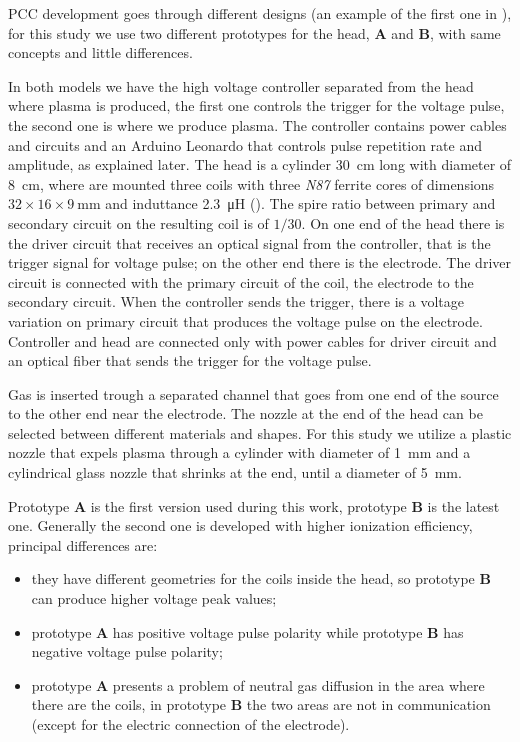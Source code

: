 PCC development goes through different designs (an example of the first one in \cite{unipd:ceciliaDBD}), for this study we use two different prototypes for the head, \textbf{A} and \textbf{B}, with same concepts and little differences.

In both models we have the high voltage controller separated from the head where plasma is produced, the first one controls the trigger for the voltage pulse, the second one is where we produce plasma.
The controller contains power cables and circuits and an Arduino Leonardo that controls pulse repetition rate and amplitude, as explained later.
The head is a cylinder \SI{30}{\centi\meter} long with diameter of \SI{8}{\centi\meter}, where are mounted three coils with three \emph{N87} ferrite cores of dimensions $32 \times 16 \times \SI{9}{\milli\meter}$ and induttance \SI{2.3}{\micro\henry} (\cite{N87datasheet}). The spire ratio between primary and secondary circuit on the resulting coil is of $1/30$.
On one end of the head there is the driver circuit that receives an optical signal from the controller, that is the trigger signal for voltage pulse; on the other end there is the electrode. The driver circuit is connected with the primary circuit of the coil, the electrode to the secondary circuit. When the controller sends the trigger, there is a voltage variation on primary circuit that produces the voltage pulse on the electrode.
Controller and head are connected only with power cables for driver circuit and an optical fiber that sends the trigger for the voltage pulse.

Gas is inserted trough a separated channel that goes from one end of the source to the other end near the electrode.
The nozzle at the end of the head can be selected between different materials and shapes. For this study we utilize a plastic nozzle that expels plasma through a cylinder with diameter of \SI{1}{\milli\meter} and a cylindrical glass nozzle that shrinks at the end, until a diameter of \SI{5}{\milli\meter}. 

Prototype \textbf{A} is the first version used during this work, prototype \textbf{B} is the latest one. Generally the second one is developed with higher ionization efficiency, principal differences are:
\begin{itemize}
 \item they have different geometries for the coils inside the head, so prototype \textbf{B} can produce higher voltage peak values;
 \item prototype \textbf{A} has positive voltage pulse polarity while prototype \textbf{B} has negative voltage pulse polarity;
 \item prototype \textbf{A} presents a problem of neutral gas diffusion in the area where there are the coils, in prototype \textbf{B} the two areas are not in communication (except for the electric connection of the electrode). 
\end{itemize}


